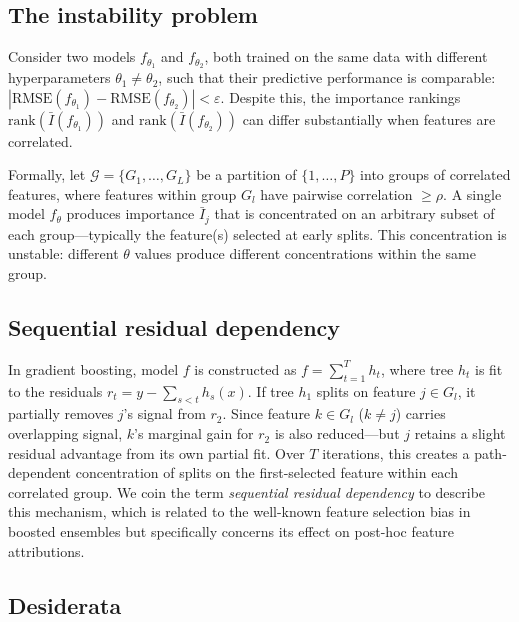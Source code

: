\documentclass[11pt]{article}
\newcommand{\rhovar}{\rho}
\begin{document}
\subsection{The instability problem}

Consider two models $f_{\theta_1}$ and $f_{\theta_2}$, both trained on the
same data with different hyperparameters $\theta_1 \neq \theta_2$, such
that their predictive performance is comparable:
$|\text{RMSE}(f_{\theta_1}) - \text{RMSE}(f_{\theta_2})| < \varepsilon$.
Despite this, the importance rankings
$\text{rank}(\bar{I}(f_{\theta_1}))$ and
$\text{rank}(\bar{I}(f_{\theta_2}))$ can differ substantially when
features are correlated.

Formally, let $\mathcal{G} = \{G_1, \ldots, G_L\}$ be a partition of
$\{1, \ldots, P\}$ into groups of correlated features, where features
within group $G_l$ have pairwise correlation $\geq \rhovar$. A single
model $f_\theta$ produces importance $\bar{I}_j$ that is concentrated on
an arbitrary subset of each group---typically the feature(s) selected at
early splits. This concentration is unstable: different $\theta$ values
produce different concentrations within the same group.

\subsection{Sequential residual dependency}

In gradient boosting, model $f$ is constructed as $f =
\sum_{t=1}^{T} h_t$, where tree $h_t$ is fit to the residuals
$r_t = y - \sum_{s<t} h_s(x)$. If tree $h_1$ splits on feature $j \in
G_l$, it partially removes $j$'s signal from $r_2$. Since feature $k
\in G_l$ ($k \neq j$) carries overlapping signal, $k$'s marginal gain
for $r_2$ is also reduced---but $j$ retains a slight residual advantage
from its own partial fit. Over $T$ iterations, this creates a
path-dependent concentration of splits on the first-selected feature
within each correlated group. We coin the term \emph{sequential residual
dependency} to describe this mechanism, which is related to the
well-known feature selection bias in boosted ensembles but specifically
concerns its effect on post-hoc feature attributions.

\subsection{Desiderata}
\end{document}
